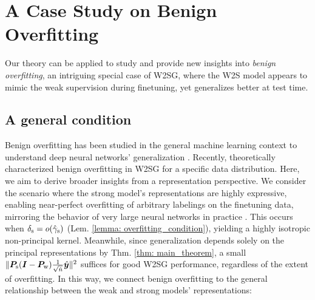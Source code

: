  
\section{A Case Study on Benign Overfitting}\label{sec: case_study}
Our theory can be applied to study and provide new insights into \emph{benign overfitting}, an intriguing special case of W2SG, where the W2S model appears to mimic the weak supervision during finetuning, yet generalizes better at test time. 


\subsection{A general condition}\label{subsec: general_bo}
Benign overfitting has been studied in the general machine learning context to understand deep neural networks' generalization \cite{bartlett2020benign,wang2021benign,frei2022benign,mallinar2022benign}. Recently, \cite{wu2024provable} theoretically characterized benign overfitting in W2SG for a specific data distribution. Here, we aim to derive broader insights from a representation perspective. We consider the scenario where the strong model's representations are highly expressive, enabling near-perfect overfitting of arbitrary labelings on the finetuning data, mirroring the behavior of very large neural networks in practice \cite{zhang2021understanding}. This occurs when $\delta_{\text{s}}=o(\hat{\gamma}_{\text{s}})$ (Lem. \ref{lemma: overfitting_condition}), yielding a highly isotropic non-principal kernel. Meanwhile, since generalization depends solely on the principal representations by Thm. \ref{thm: main_theorem}, a small $\|{\bm{P}}_{\text{s}} ({\bm{I}} - {\bm{P}}_{\text{w}}) \frac{1}{\sqrt{\hat{n}}} \hat{{\bm{y}}} \|^2$ suffices for good W2SG performance, regardless of the extent of overfitting. In this way, we connect benign overfitting to the general relationship between the weak and strong models' representations: 

